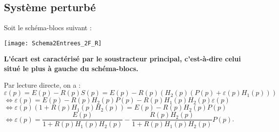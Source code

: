 %

%
%

\subsection{Système perturbé}
Soit le schéma-blocs suivant : 
\begin{center}
%
\texttt{[image: Schema2Entrees\_2F\_R]}
\end{center}

\vspace{.25cm}

\textbf{L'écart est caractérisé par le soustracteur principal, c'est-à-dire celui situé le plus à gauche du schéma-blocs.}

\vspace{.25cm}

Par lecture directe, on a : 
$\varepsilon(p)
=E(p)-R(p)S(p)
=E(p)-R(p)\left(H_2(p) \left(P(p)+\varepsilon(p)H_1(p) \right)\right)$
$\Longleftrightarrow 
\varepsilon(p) =E(p)- R(p)H_2(p)P(p)-R(p)H_1(p)H_2(p)\varepsilon(p) $
$\Longleftrightarrow \varepsilon(p)\left( 1+R(p)H_1(p)H_2(p)\right) =E(p)- R(p)H_2(p)P(p)$
$\Longleftrightarrow \varepsilon(p) =\dfrac{E(p)}{1+R(p)H_1(p)H_2(p)}- \dfrac{R(p)H_2(p)}{1+R(p)H_1(p)H_2(p)}P(p)$.

